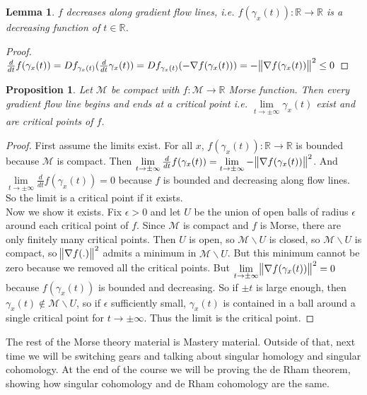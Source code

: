\documentclass[10pt]{article}
\theoremstyle{plain}
\newtheorem{lemma}[thm]{Lemma}
\newtheorem{prop}[thm]{Proposition}
\theoremstyle{definition}
\newcommand{\Real}{\mathbb{R}}
\newcommand{\man}{\mathcal{M}}
\newcommand{\deriv}{d}
\newcommand{\dt}{\deriv t}
\newcommand{\tdiffof}[1]{\frac{\deriv #1}{\dt}}
\begin{document}
\begin{lemma}
    $f$ decreases along gradient flow lines, i.e. $f(\gamma_x(t)):\Real \to \Real$ is a decreasing function of $t\in\Real$.
\end{lemma}
\begin{proof}
    $\tdiffof{} f(\gamma_x(t)) = Df_{\gamma_x(t)} (\tdiffof{} \gamma_x(t)) = Df_{\gamma_x(t)}(- \nabla f(\gamma_x(t))) = - \norm{\nabla f(\gamma_x(t))}^2 \leq 0$
\end{proof}

\begin{prop}\label{prop:GradientFlowLimitsCriticalPoints}
   Let $\man$ be compact with $f:\man\to\Real$ Morse function. Then every gradient flow line begins and ends at a critical point i.e. $\lim \limits_{t \to \pm \infty} \gamma_x(t) $ exist and are critical points of $f$.
\end{prop}

\begin{proof}
    First assume the limits exist. For all $x$, $f(\gamma_x(t)) : \Real \to \Real$ is bounded because $\man$ is compact. Then $\lim \limits_{t \to \pm \infty} \tdiffof{} f(\gamma_x(t)) = \lim \limits_{t \to \pm \infty} - \norm{\nabla f(\gamma_x(t))}^2$. And $\lim \limits_{t \to \pm \infty} \tdiffof{}f(\gamma_x(t)) = 0$ because $f$ is bounded and decreasing along flow lines. So the limit is a critical point if it exists.\\
    Now we show it exists. Fix $\epsilon> 0$ and let $U $ be the union of open balls of radius $\epsilon$ around each critical point of $f.$ Since $\man$ is compact and $f$ is Morse, there are only finitely many critical points. Then $U$ is open, so $\man \backslash U$ is closed, so $\man \backslash U$ is compact, so $\norm{\nabla f(.)}^2$ admits a minimum in $\man \backslash U$. But this minimum cannot be zero because we removed all the critical points. But $\lim \limits_{t \to \pm \infty}\norm{\nabla f(\gamma_x(t))}^2 = 0$ because $f(\gamma_x(t))$ is bounded and decreasing. So if $\pm t$ is large enough, then $\gamma_x(t) \not\in \man \backslash U$, so if $\epsilon $ sufficiently small, $\gamma_x(t)$ is contained in a ball around a single critical point for $t \to \pm \infty$. Thus the limit is the critical point. 
\end{proof}
The rest of the Morse theory material is Mastery material. Outside of that, next time we will be switching gears and talking about singular homology and singular cohomology. At the end of the course we will be proving the de Rham theorem, showing how singular cohomology and de Rham cohomology are the same.
\end{document}

